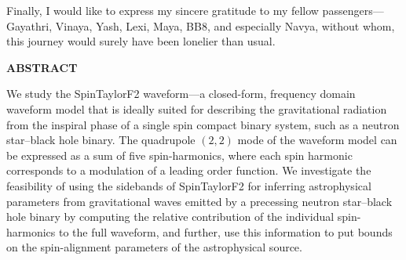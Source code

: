 \documentclass[12pt, a4wide]{report}
\begin{document}
Finally, I would like to express my sincere gratitude to my fellow 
passengers---Gayathri, Vinaya, Yash, Lexi, Maya, BB8, and especially Navya,
without whom, this journey would surely have been lonelier than usual.

\clearpage

\begin{center}
\textbf{ABSTRACT}\\
\end{center}

We study the SpinTaylorF2 waveform---a closed-form, frequency domain waveform
model that is ideally suited for describing the gravitational radiation from
the inspiral phase of a single spin compact binary system, such as a neutron
star--black hole binary. The quadrupole $(2,2)$ mode of the waveform model can
be expressed as a sum of five spin-harmonics, where each spin harmonic
corresponds to a modulation of a leading order function. We investigate the
feasibility of using the sidebands of SpinTaylorF2 for inferring astrophysical
parameters from gravitational waves emitted by a precessing neutron 
star--black hole binary by computing the relative contribution of the individual
spin-harmonics to the full waveform, and further, use this information to put
bounds on the spin-alignment parameters of the astrophysical source.

\clearpage
\tableofcontents
\listoffigures
\newpage
{}
\setcounter{page}{1}






% 


\begin{appendices}

% 
% 
\end{appendices}


{\normalsize
}
\end{document}
